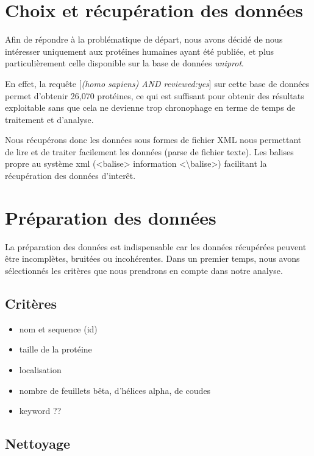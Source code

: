 \section*{Choix et récupération des données}

Afin de répondre à la problématique de départ, nous avons décidé de nous intéresser uniquement aux protéines humaines ayant été publiée, et plus particulièrement celle disponible sur la base de données \emph{uniprot}.

En effet, la requête [\emph{(homo sapiens) AND reviewed:yes}] sur cette base de données permet d'obtenir 26,070 protéines, ce qui est suffisant pour obtenir des résultats exploitable sans que cela ne devienne trop chronophage en terme de temps de traitement et d'analyse.

Nous récupérons donc les données sous formes de fichier XML nous permettant de lire et de traiter facilement les données (parse de fichier texte). Les balises propre au système xml (<balise> information <\textbackslash balise>) facilitant la récupération des données d'inter\^et.

\section*{Préparation des données}
La préparation des données est indispensable car les données récupérées peuvent être incomplètes, bruitées ou incohérentes. 
Dans un premier temps, nous avons sélectionnés les critères que nous prendrons en compte dans notre analyse. 

\subsection*{Critères}
\begin{itemize}
\item nom et sequence (id)
\item taille de la protéine
\item localisation 
\item nombre de feuillets bêta, d'hélices alpha, de coudes
\item keyword ??
\end{itemize}

\subsection*{Nettoyage}
